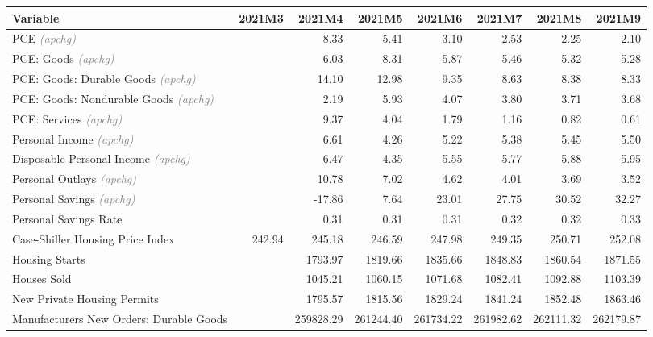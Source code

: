 \documentclass[11pt, letterpaper]{article}\usepackage[]{graphicx}\usepackage[]{color}
\begin{document}
\begin{table}[H]
\centering
\begingroup\fontsize{10pt}{12pt}\selectfont
\begin{tabular}{lrrrrrrr}
  \hline
Variable & 2021M3 & 2021M4 & 2021M5 & 2021M6 & 2021M7 & 2021M8 & 2021M9 \\ 
  \hline
PCE \textit{\footnotesize\textcolor{gray}{(apchg)}} &  & 8.33 & 5.41 & 3.10 & 2.53 & 2.25 & 2.10 \\ 
  PCE: Goods \textit{\footnotesize\textcolor{gray}{(apchg)}} &  & 6.03 & 8.31 & 5.87 & 5.46 & 5.32 & 5.28 \\ 
  PCE: Goods: Durable Goods \textit{\footnotesize\textcolor{gray}{(apchg)}} &  & 14.10 & 12.98 & 9.35 & 8.63 & 8.38 & 8.33 \\ 
  PCE: Goods: Nondurable Goods \textit{\footnotesize\textcolor{gray}{(apchg)}} &  & 2.19 & 5.93 & 4.07 & 3.80 & 3.71 & 3.68 \\ 
  PCE: Services \textit{\footnotesize\textcolor{gray}{(apchg)}} &  & 9.37 & 4.04 & 1.79 & 1.16 & 0.82 & 0.61 \\ 
  Personal Income \textit{\footnotesize\textcolor{gray}{(apchg)}} &  & 6.61 & 4.26 & 5.22 & 5.38 & 5.45 & 5.50 \\ 
  Disposable Personal Income \textit{\footnotesize\textcolor{gray}{(apchg)}} &  & 6.47 & 4.35 & 5.55 & 5.77 & 5.88 & 5.95 \\ 
  Personal Outlays \textit{\footnotesize\textcolor{gray}{(apchg)}} &  & 10.78 & 7.02 & 4.62 & 4.01 & 3.69 & 3.52 \\ 
  Personal Savings \textit{\footnotesize\textcolor{gray}{(apchg)}} &  & -17.86 & 7.64 & 23.01 & 27.75 & 30.52 & 32.27 \\ 
  Personal Savings Rate &  & 0.31 & 0.31 & 0.31 & 0.32 & 0.32 & 0.33 \\ 
  Case-Shiller Housing Price Index & 242.94 & 245.18 & 246.59 & 247.98 & 249.35 & 250.71 & 252.08 \\ 
  Housing Starts &  & 1793.97 & 1819.66 & 1835.66 & 1848.83 & 1860.54 & 1871.55 \\ 
  Houses Sold &  & 1045.21 & 1060.15 & 1071.68 & 1082.41 & 1092.88 & 1103.39 \\ 
  New Private Housing Permits &  & 1795.57 & 1815.56 & 1829.24 & 1841.24 & 1852.48 & 1863.46 \\ 
  Manufacturers New Orders: Durable Goods &  & 259828.29 & 261244.40 & 261734.22 & 261982.62 & 262111.32 & 262179.87 \\ 

\end{tabular}
\end{table}
\end{document}
